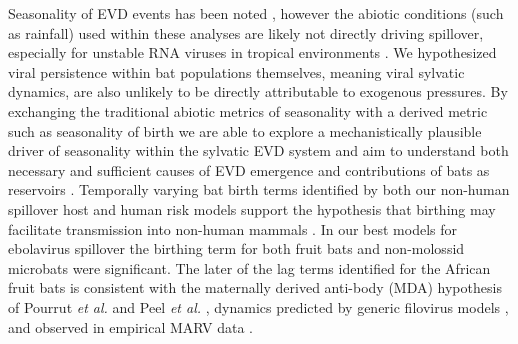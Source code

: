 \documentclass[a4paper,twoside, onecolumn]{article}
\begin{document}
	Seasonality of EVD events has been noted \cite{Schmidt2017}, however the abiotic conditions (such as rainfall) used within these analyses are likely not directly driving spillover, especially for unstable RNA viruses in tropical environments \cite{Fischer2015}. We hypothesized viral persistence within bat populations themselves, meaning viral sylvatic dynamics, are also unlikely to be directly attributable to exogenous pressures. By exchanging the traditional abiotic metrics of seasonality with a derived metric such as seasonality of birth we are able to explore a mechanistically plausible driver of seasonality within the sylvatic EVD system \cite{Altizer2006} and aim to understand both necessary and sufficient causes of EVD emergence and contributions of bats as reservoirs \cite{nishiura2009find,rothman1976causes}. Temporally varying bat birth terms identified by both our non-human spillover host and human risk models support the hypothesis that birthing may facilitate transmission into non-human mammals \cite{Pourrut2009,Schuh2017}. In our best models for ebolavirus spillover the birthing term for both fruit bats and non-molossid microbats were significant. The later of the lag terms identified for the African fruit bats is consistent with the maternally derived anti-body (MDA) hypothesis of Pourrut \textit{et al.} \cite{Pourrut2009} and Peel \textit{et al.} \cite{Peel2018}, dynamics predicted by generic filovirus models \cite{Hayman2015}, and observed in empirical MARV data \cite{Amman2012}. \par
\end{document}
